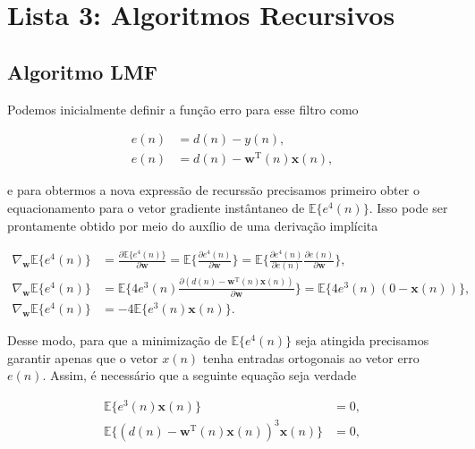 \section{Lista 3: Algoritmos Recursivos} %


\subsection{Algoritmo LMF} %

Podemos inicialmente definir a função erro para esse filtro como

\begin{align}
    e(n) &= d(n) - y(n), \\
    e(n) &= d(n) - \mathbf{w}^{\text{T}}(n)\mathbf{x}(n),
\end{align}

e para obtermos a nova expressão de recurssão precisamos primeiro obter o equacionamento para o vetor gradiente instântaneo de $\mathbb{E}\{e^{4}(n)\}$. Isso pode ser prontamente obtido por meio do auxílio de uma derivação implícita

\begin{align}
    \nabla_{\mathbf{w}} \mathbb{E}\{e^{4}(n)\} &= \frac{\partial \mathbb{E}\{e^{4}(n)\}}{\partial \mathbf{w}} = \mathbb{E}\{ \frac{\partial e^{4}(n)}{\partial \mathbf{w}}\} = \mathbb{E}\{ \frac{\partial e^{4}(n)}{\partial e(n)} \frac{\partial e(n) }{\partial \mathbf{w}}\}, \\
    \nabla_{\mathbf{w}} \mathbb{E}\{e^{4}(n)\} &= \mathbb{E}\{4 e^{3}(n) \frac{\partial (d(n) - \mathbf{w}^{\text{T}}(n)\mathbf{x}(n)) }{\partial \mathbf{w}}\} = \mathbb{E}\{4 e^{3}(n) (0 - \mathbf{x}(n))\}, \\
    \nabla_{\mathbf{w}} \mathbb{E}\{e^{4}(n)\} &= - 4 \mathbb{E}\{e^{3}(n) \mathbf{x}(n)\}.
\end{align}

Desse modo, para que a minimização de $\mathbb{E}\{e^{4}(n)\}$ seja atingida precisamos garantir apenas que o vetor $x(n)$ tenha entradas ortogonais ao vetor erro $e(n)$. Assim, é necessário que a seguinte equação seja verdade

\begin{align}
    \mathbb{E}\{e^{3}(n) \mathbf{x}(n)\} &= 0, \\
    \mathbb{E}\{(d(n) - \mathbf{w}^{\text{T}}(n)\mathbf{x}(n))^{3} \mathbf{x}(n)\} &= 0, 
\end{align}

